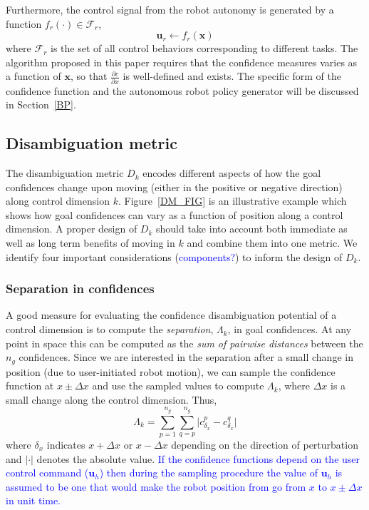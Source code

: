 \documentclass[conference]{IEEEtran}
\begin{document}
Furthermore, the control signal from the robot autonomy is generated by a function $f_{r}(\cdot) \in \mathcal{F}_{r}$, 
\begin{equation*}
\boldsymbol{u}_r \leftarrow f_{r}(\boldsymbol{x})
\end{equation*}
where $\mathcal{F}_{r}$ is the set of all control behaviors corresponding to different tasks. The algorithm proposed in this paper requires that the confidence measures varies as a function of $\boldsymbol{x}$, so that $\frac{\partial c}{\partial x}$ is well-defined and exists. The specific form of the confidence function and the autonomous robot policy generator will be discussed in Section~\ref{BP}.
\subsection{Disambiguation metric}\label{DM}

The disambiguation metric $D_{k}$ encodes different aspects of how the goal confidences change upon moving (either in the positive or negative direction) along control dimension $k$. Figure~\ref{DM_FIG} is an illustrative example which shows how goal confidences can vary as a function of position along a control dimension. A proper design of $D_{k}$ should take into account both immediate as well as long term benefits of moving in $k$ and combine them into one metric. We identify four important considerations (\textcolor{blue}{components?}) to  inform the design of $D_{k}$.

\subsubsection{Separation in confidences}
A good measure for evaluating the confidence disambiguation potential of a control dimension is to compute the \textit{separation}, $\Lambda_{k}$, in goal confidences. At any point in space this can be computed as the \textit{sum of pairwise distances} between the $n_g$ confidences. Since we are interested in the separation after a small change in position (due to user-initiated robot motion), we can sample the confidence function at $x\pm\Delta x$ and use the sampled values to compute $\Lambda_{k}$, where $\Delta x$ is a small change along the control dimension. Thus,
\begin{equation*}
\Lambda_{k} = \sum_{p=1}^{n_g}\sum_{q=p}^{n_g}\lvert c^{p}_{\delta_x} - c^{q}_{\delta_x}\rvert
\end{equation*}
where $\delta_x$ indicates $x+\Delta x$ or $x-\Delta x$ depending on the direction of perturbation and $\lvert\cdot\rvert$ denotes the absolute value. \textcolor{blue}{If the confidence functions depend on the user control command ($\boldsymbol{u}_h$) then during the sampling procedure the value of $\boldsymbol{u}_h$ is assumed to be one that would make the robot position from go from $x$ to $x\pm\Delta x$ in unit time.}
\end{document}
